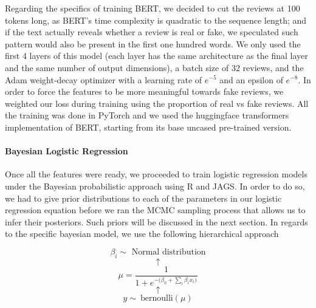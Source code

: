 \documentclass[man, floatsintext, 10pt]{apa6}
\begin{document}
Regarding the specifics of training BERT, we decided to cut the reviews at 100 tokens long, as BERT's time complexity is quadratic to the sequence length; and if the text actually reveals whether a review is real or fake, we speculated such pattern would also be present in the first one hundred words. We only used the first 4 layers of this model (each layer has the same architecture as the final layer and the same number of output dimensions), a batch size of 32 reviews, and the Adam weight-decay optimizer with a learning rate of $e^{-5}$ and an epsilon of $e^{-8}$. In order to force the features to be more meaningful towards fake reviews, we weighted our loss during training using the proportion of real vs fake reviews. All the training was done in PyTorch and we used the huggingface transformers implementation of BERT, starting from its base uncased pre-trained version.

\vspace{2mm}

\paragraph{Bayesian Logistic Regression} Once all the features were ready, we proceeded to train logistic regression models under the Bayesian probabilistic approach using R and JAGS. In order to do so, we had to give prior distributions to each of the parameters in our logistic regression equation before we ran the MCMC sampling process that allows us to infer their posteriors. Such priors will be discussed in the next section. In regards to the specific bayesian model, we use the following hierarchical approach 

\[\beta_i \sim \text{ Normal distribution} \] \[ \uparrow \] 
\begin{equation} 
\label{Bern} 
\mu = \frac{1}{1 + e^{-\big(\beta_0 + \sum_i \beta_i x_i \big)}} 
\end{equation}
\vspace{0.01mm} \[ \uparrow \] \[ y \sim\ \text{bernoulli} (\mu) \]
\end{document}

